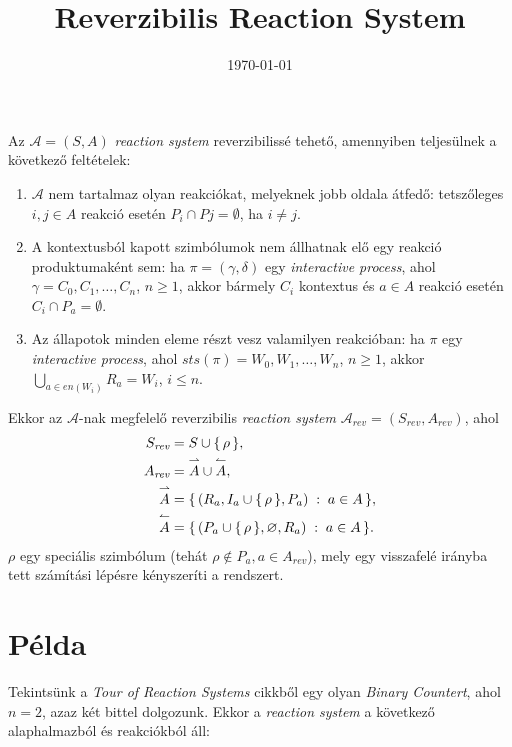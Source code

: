 \documentclass[12pt]{article}
\title{Reverzibilis Reaction System}
\date{\today}
\begin{document}
    \maketitle

    \begin{definition*}
        Az $\mathcal{A} = (S, A)$ \textit{reaction system} reverzibilissé tehető, amennyiben teljesülnek a következő feltételek:
        \begin{enumerate}[label={(\arabic*)}]
            \item
            $\mathcal{A}$ nem tartalmaz olyan reakciókat, melyeknek jobb oldala átfedő: tetszőleges $i, j \in A$ reakció esetén $P_{i} \cap P{j} = \emptyset$, ha $i \neq j$.

            \item
            A kontextusból kapott szimbólumok nem állhatnak elő egy reakció produktumaként sem: ha $\pi = (\gamma, \delta)$ egy \textit{interactive process}, ahol $\gamma = C_{0}, C_{1}, \ldots, C_{n}$, $n \geq 1$, akkor bármely $C_{i}$ kontextus és $a \in A$ reakció esetén $C_{i} \cap P_{a} = \emptyset$.

            \item
            Az állapotok minden eleme részt vesz valamilyen reakcióban: ha $\pi$ egy \textit{interactive process}, ahol $\textit{sts}(\pi) = W_{0}, W_{1}, \ldots, W_{n}$, $n \geq 1$, akkor $\bigcup_{a \in \textit{en}(W_{i})} R_{a} = W_{i}$, $i \leq n$.
        \end{enumerate}
        Ekkor az $\mathcal{A}$-nak megfelelő reverzibilis \textit{reaction system} $\mathcal{A}_{\textit{rev}} = (S_{\textit{rev}}, A_{\textit{rev}})$, ahol
        \begin{align*}
            S_{\textit{rev}} &= S \cup \{ \, \rho \, \}, \\
            A_{\textit{rev}} &= \overset{\rightharpoonup} A \cup \overset{\leftharpoonup} A, \\ 
            \overset{\rightharpoonup} A &= \{ \, (R_{a}, I_{a} \cup \{ \, \rho \, \}, P_{a}) \; : \; a \in A \, \}, \\
            \overset{\leftharpoonup} A &= \{ \, (P_{a} \cup \{ \, \rho \, \}, \varnothing, R_{a}) \; : \; a \in A \, \}.
        \end{align*}
        $\rho$ egy speciális szimbólum (tehát $\rho \notin P_{a}, a \in A_{\textit{rev}}$), mely egy visszafelé irányba tett számítási lépésre kényszeríti a rendszert.
    \end{definition*}

    \section*{Példa}
    Tekintsünk a \textit{Tour of Reaction Systems} cikkből egy olyan \textit{Binary Countert}, ahol $n = 2$, azaz két bittel dolgozunk. Ekkor a \textit{reaction system} a következő alaphalmazból és reakciókból áll:
\end{document}
